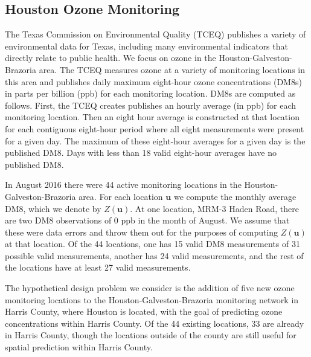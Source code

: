 \documentclass[12pt]{article}
\begin{document}
\subsection{Houston Ozone Monitoring}\label{sec:houston}
The Texas Commission on Environmental Quality (TCEQ) publishes a variety of environmental data for Texas, including many environmental indicators that directly relate to public health. We focus on ozone in the Houston-Galveston-Brazoria area. The TCEQ measures ozone at a variety of monitoring locations in this area and publishes daily maximum eight-hour ozone concentrations (DM8s) in parts per billion (ppb) for each monitoring location. DM8s are computed as follows. First, the TCEQ creates publishes an hourly average (in ppb) for each monitoring location. Then an eight hour average is constructed at that location for each contiguous eight-hour period where all eight measurements were present for a given day. The maximum of these eight-hour averages for a given day is the published DM8. Days with less than 18 valid eight-hour averages have no published DM8.

In August 2016 there were 44 active monitoring locations in the Houston-Galveston-Brazoria area. For each location $\bm{u}$ we compute the monthly average DM8, which we denote by $Z(\bm{u})$. At one location, MRM-3 Haden Road, there are two DM8 observations of 0 ppb in the month of August. We assume that these were data errors and throw them out for the purposes of computing $Z(\bm{u})$ at that location. Of the 44 locations, one has 15 valid DM8 measurements of 31 possible valid measurements, another has 24 valid measurements, and the rest of the locations have at least 27 valid measurements. 

The hypothetical design problem we consider is the addition of five new ozone monitoring locations to the Houston-Galveston-Brazoria monitoring network in Harris County, where Houston is located, with the goal of predicting ozone concentrations within Harris County. Of the 44 existing locations, 33 are already in Harris County, though the locations outside of the county are still useful for spatial prediction within Harris County. 
\end{document}
